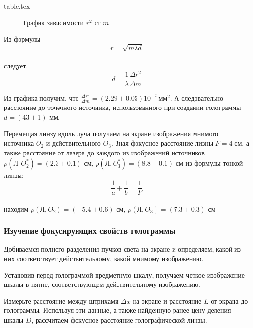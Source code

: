         {table.tex}

        \begin{figure}[h!]
            \caption{График зависимости $r^2$ от $m$}
        \end{figure}

        Из формулы 
        \\
        $$
        r = \sqrt{m \lambda d}
        $$
        \\
        следует:
        \\
        $$
        d = \frac{1}{\lambda} \frac{\Delta r^2}{\Delta m}
        $$
        
        Из графика получим, что $\frac{\Delta r^2}{\Delta m} = (2.29 \pm 0.05) 10^{-2} \: мм^2$.
        А следовательно расстояние до точечного источника, использованного при создании 
        голограммы $d = (43 \pm 1)$ мм.

        Перемещая линзу вдоль луча получаем на экране изображения мнимого источника $O_2$
        и действительного $O_3$. Зная фокусное расстояние лизны $F = 4$ см, а также 
        расстояние от лазера до каждого из изображений источников 
        $\rho(\text{Л}, O_2^*) = (2.3 \pm 0.1)$ см,
        $\rho(\text{Л}, O_3^*) = (8.8 \pm 0.1)$ см из формулы тонкой линзы: 
        \\
        $$
        \frac{1}{a} + \frac{1}{b} = \frac{1}{F}
        $$
        \\
        находим $\rho(\text{Л}, O_2) = (-5.4 \pm 0.6)$ см,
        $\rho(\text{Л}, O_3) = (7.3 \pm 0.3)$ см

    \subsubsection*{Изучение фокусирующих свойств голограммы}

        Добиваемся полного разделения пучков света на экране и определяем, какой из них соответствует действительному, какой мнимому изображению. 

        \noindent Установив перед голограммой предметную шкалу, получаем четкое изображение шкалы в пятне, соответствующем действительному изображению.
        
        \noindent Измерьте расстояние между штрихами $ \Delta x $ на экране и расстояние $L$ от экрана до голограммы. Используя эти данные, а также найденную ранее цену деления шкалы $D$, рассчитаем фокусное расстояние голографической линзы.
        
